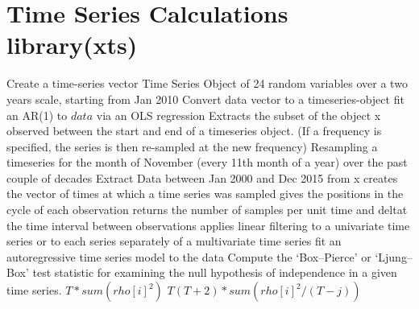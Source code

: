 \section{Time Series Calculations \rarrow library(xts)}{}
	{Create a time-series vector}
	{Time Series Object
of 24 random variables over a two years scale, starting from Jan 2010}
	{Convert data vector to a timeseries-object}
	{fit an AR(1) to $data$ via
    an OLS regression}
	{Extracts the subset of the object x observed between the
    start and end of a timeseries object. (If a frequency is specified, the series
            is then re-sampled at the new frequency)}
	{Resampling a timeseries for
    the month of November (every 11th month of a year) over the past couple of decades}
	{Extract Data between Jan 2000 and Dec 2015 from x}
	{creates the vector of times at which a time series was sampled}
	{gives the positions in the cycle of each observation}
	{returns the number of samples per unit time and deltat the
    time interval between observations}
	{applies linear filtering to a univariate time series
    or to each series separately of a multivariate time series}
	{fit an autoregressive time series model to the data}
	{Compute the `Box--Pierce' or `Ljung--Box'
test statistic for examining the null hypothesis of independence in a given
time series.}
	{$T\ast sum(rho[i]^2)$}
	{$T(T+2)\ast sum(rho[i]^2/(T-j))$}


